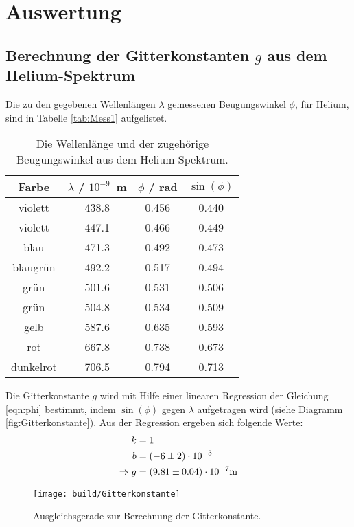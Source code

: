 \section{Auswertung}
\label{sec:Auswertung}

\subsection{Berechnung der Gitterkonstanten $g$ aus dem Helium-Spektrum}
Die zu den gegebenen Wellenlängen $\lambda$ gemessenen Beugungswinkel $\phi$, für Helium, sind in Tabelle \eqref{tab:Mess1} aufgelistet.

\begin{table}[H] %
  \centering
  \begin{tabular}{c| c c c}
    \toprule
    Farbe & $\lambda$ / $10^{-9}$\, m & $\phi$ / rad & $\sin(\phi)$ \\
    \midrule
      violett   & 438.8 & 0.456 & 0.440 \\
      violett   & 447.1 & 0.466 & 0.449 \\
      blau      & 471.3 & 0.492 & 0.473 \\
      blaugrün  & 492.2 & 0.517 & 0.494 \\
      grün      & 501.6 & 0.531 & 0.506 \\
      grün      & 504.8 & 0.534 & 0.509 \\
      gelb      & 587.6 & 0.635 & 0.593 \\
      rot       & 667.8 & 0.738 & 0.673 \\
      dunkelrot & 706.5 & 0.794 & 0.713 \\
    \bottomrule
  \end{tabular}
  \caption{Die Wellenlänge und der zugehörige Beugungswinkel aus dem Helium-Spektrum.}
  \label{tab:Mess1}
\end{table}

Die Gitterkonstante $g$ wird mit Hilfe einer linearen Regression der Gleichung \eqref{eqn:phi} bestimmt, indem $\sin(\phi)$ gegen $\lambda$ aufgetragen wird (siehe Diagramm \eqref{fig:Gitterkonstante}). Aus der Regression ergeben sich folgende Werte:
\begin{align*}
  k & = 1 \\
  b & = (\num{-6 +- 2}) \cdot 10^{-3} \\
  \Rightarrow g & = (\num{9.81 +- 0.04}) \cdot 10^{-7} \text{m}
\end{align*}

\begin{figure}[H]
  \centering
  \texttt{[image: build/Gitterkonstante]}
  \caption{Ausgleichsgerade zur Berechnung der Gitterkonstante.}
  \label{fig:Gitterkonstante}
\end{figure}


